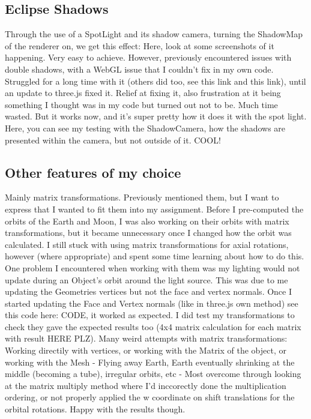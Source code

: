 \documentclass[12pt]{article}
\begin{document}
\subsection{Eclipse Shadows}
Through the use of a SpotLight and its shadow camera, turning the ShadowMap of the renderer on, we get this effect: Here, look at some screenshots of it happening. Very easy to achieve. However, previously encountered issues with double shadows, with a WebGL issue that I couldn't fix in my own code. Struggled for a long time with it (others did too, see this link and this link), until an update to three.js fixed it. Relief at fixing it, also frustration at it being something I thought was in my code but turned out not to be. Much time wasted. But it works now, and it's super pretty how it does it with the spot light. Here, you can see my testing with the ShadowCamera, how the shadows are presented within the camera, but not outside of it. COOL!

\subsection{Other features of my choice}
Mainly matrix transformations. Previously mentioned them, but I want to express that I wanted to fit them into my assignment. Before I pre-computed the orbits of the Earth and Moon, I was also working on their orbits with matrix transformations, but it became unnecessary once I changed how the orbit was calculated. I still stuck with using matrix transformations for axial rotations, however (where appropriate) and spent some time learning about how to do this. One problem I encountered when working with them was my lighting would not update during an Object's orbit around the light source. This was due to me updating the Geometries vertices but not the face and vertex normals. Once I started updating the Face and Vertex normals (like in three.js own method) see this code here: CODE, it worked as expected. I did test my transformations to check they gave the expected results too (4x4 matrix calculation for each matrix with result HERE PLZ). Many weird attempts with matrix transformations: Working directily with vertices, or working with the Matrix of the object, or working with the Mesh - Flying away Earth, Earth eventually shrinking at the middle (becoming a tube), irregular orbits, etc - Most overcome through looking at the matrix multiply method where I'd inccorectly done the multiplication ordering, or not properly applied the w coordinate on shift translations for the orbital rotations. Happy with the results though.
\end{document}
